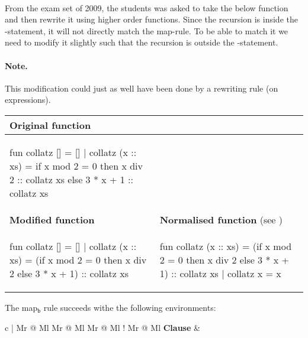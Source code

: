 \begin{example}\
  \label{ex:map-instance-collatz}\\
  From the exam set of 2009, the students was asked to take the below
  function and then rewrite it using higher order functions. Since the recursion
  is inside the \ttt{if}-statement, it will not directly match the
  \textsf{map}-rule. To be able to match it we need to modify it slightly such
  that the recursion is outside the \ttt{if}-statement.

  \paragraph{Note.} This modification could just as well have been done by
  a rewriting rule (on expressions).
  \begin{center}
    \begin{tabular}{|l|l|}
      \hline
      \textbf{Original function}
      &
      \\ \hline
      \begin{sml}
fun collatz [] = []
  | collatz (x :: xs) =
      if x mod 2 = 0 then
        x div 2 :: collatz xs
      else
        3 * x + 1 :: collatz xs
      \end{sml}
      &
      \\ \hline
      \textbf{Modified function}
      &
      \textbf{Normalised function}
      \footnotesize{(see \fref{tr:trace-normalise-collatz})}
      \\ \hline
      \begin{sml}
fun collatz [] = []
  | collatz (x :: xs) =
      (if x mod 2 = 0 then
       x div 2 else 3 * x + 1)
      :: collatz xs
      \end{sml}
      &
      \begin{sml}
fun collatz (x :: xs) =
      (if x mod 2 = 0 then
       x div 2 else 3 * x + 1)
      :: collatz xs
  | collatz x = x
      \end{sml}
      \\ \hline
    \end{tabular}
  \end{center}
  The \textsf{map$_\textsf{b}$} rule succeeds withe the following environments:
  \begin{center}
    \begin{tabular}{c | Mr @{} Ml Mr @{} Ml Mr @{} Ml !{\hspace{3em}} Mr @{} Ml}
      \textbf{Clause}
      & 

\end{tabular}
\end{center}
\end{example}
